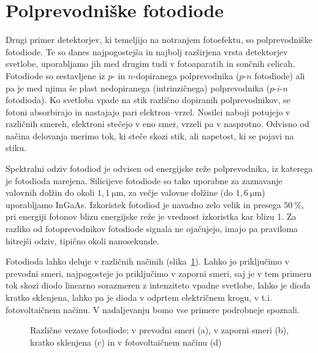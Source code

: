 \section{Polprevodniške fotodiode}
Drugi primer detektorjev, ki temeljijo na notranjem fotoefektu,
so polprevodniške fotodiode.
Te so danes najpogostejša in najbolj razširjena vrsta detektorjev svetlobe, uporabljamo jih med
drugim tudi v fotoaparatih in sončnih celicah. Fotodiode so sestavljene iz $p$- in $n$-dopiranega 
polprevodnika ($p$-$n$ fotodiode) ali pa je med njima še plast nedopiranega (intrinzičnega) 
polprevodnika ($p$-$i$-$n$ fotodioda). Ko svetloba vpade na stik različno dopiranih polprevodnikov,
se fotoni absorbirajo in nastajajo 
pari elektron--vrzel. Nosilci naboji potujejo v različnih smereh, elektroni stečejo v eno smer,
vrzeli pa v nasprotno. Odvisno od načina delovanja merimo tok, ki steče skozi 
stik, ali napetost, ki se pojavi na stiku. 

Spektralni odziv 
fotodiod je odvisen od energijske reže polprevodnika, 
iz katerega je fotodioda narejena.
Silicijeve  fotodiode so tako uporabne za zaznavanje valovnih dolžin do okoli
$1,1~\si{\micro\meter}$, za večje valovne dolžine (do $1,6~\si{\micro\meter}$) 
uporabljamo InGaAs. Izkoristek fotodiod
je navadno zelo velik in presega $50~\%$, pri energiji fotonov blizu energijske reže 
je vrednost izkoristka kar blizu 1.
Za razliko od fotoprevodnikov fotodiode signala
ne ojačujejo, imajo pa praviloma hitrejši odziv, tipično okoli nanosekunde.

Fotodioda lahko deluje v različnih načinih (slika~\ref{11_PD}). 
Lahko jo priključimo v prevodni smeri,
najpogosteje jo priključimo v zaporni smeri, saj je v
tem primeru tok skozi diodo linearno sorazmeren z intenziteto vpadne svetlobe, lahko 
je dioda kratko sklenjena, lahko pa je dioda v odprtem električnem krogu, v t.i. fotovoltaičnem 
načinu. V nadaljevanju bomo vse primere podrobneje spoznali.
\begin{figure}[h]
\centering
\def\svgwidth{130truemm} 

\caption{Različne vezave fotodiode: v prevodni smeri (a), v zaporni smeri (b), kratko sklenjena (c) in 
v fotovoltaičnem načinu (d)}
\label{11_PD}
\end{figure}

